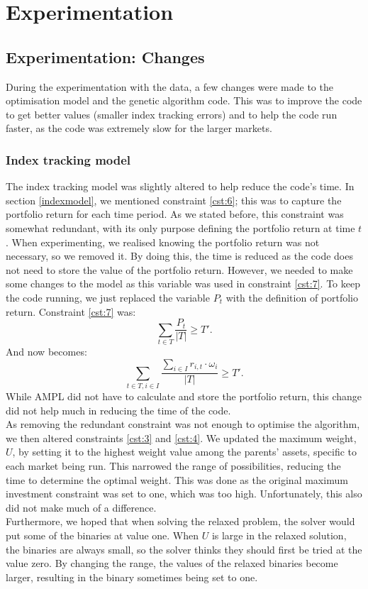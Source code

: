 \documentclass[12pt]{report}
\begin{document}
\chapter{Experimentation}
\section{Experimentation: Changes}
During the experimentation with the data, a few changes were made to the optimisation model and the genetic algorithm code. This was to improve the code to get better values (smaller index tracking errors) and to help the code run faster, as the code was extremely slow for the larger markets.

\subsection*{Index tracking model}
The index tracking model was slightly altered to help reduce the code's time. In section \ref{indexmodel}, we mentioned constraint \ref{cst:6}; this was to capture the portfolio return for each time period. As we stated before, this constraint was somewhat redundant, with its only purpose defining the portfolio return at time $t$. When experimenting, we realised knowing the portfolio return was not necessary, so we removed it. By doing this, the time is reduced as the code does not need to store the value of the portfolio return. However, we needed to make some changes to the model as this variable was used in constraint \ref{cst:7}. To keep the code running, we just replaced the variable $P_t$ with the definition of portfolio return.
\newline \noindent
Constraint \ref{cst:7} was:
$$\sum_{t \in T} \frac{P_t}{|T|} \geq T' .$$
And now becomes:
$$\sum_{t \in T, i \in I} \frac{\sum_{i \in I} r_{i,t}\cdot\omega_i}{|T|} \geq T'.$$
While AMPL did not have to calculate and store the portfolio return, this change did not help much in reducing the time of the code.\\
\newline \noindent
As removing the redundant constraint was not enough to optimise the algorithm, we then altered constraints \ref{cst:3} and \ref{cst:4}. We updated the maximum weight, $U$, by setting it to the highest weight value among the parents' assets, specific to each market being run. This narrowed the range of possibilities, reducing the time to determine the optimal weight. This was done as the original maximum investment constraint was set to one, which was too high. Unfortunately, this also did not make much of a difference. 
\\ \newline \noindent
Furthermore, we hoped that when solving the relaxed problem, the solver would put some of the binaries at value one. When $U$ is large in the relaxed solution, the binaries are always small, so the solver thinks they should first be tried at the value zero. By changing the range, the values of the relaxed binaries become larger, resulting in the binary sometimes being set to one.
\end{document}
